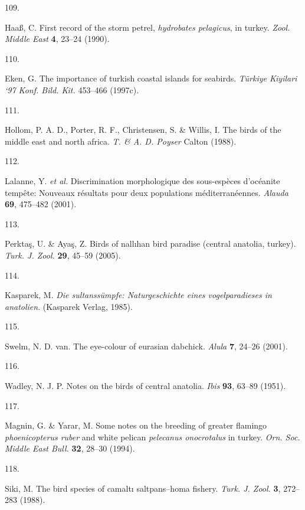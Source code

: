 \documentclass[
  letterpaper,
  DIV=11,
  numbers=noendperiod]{scrreprt}
\newlength{\cslhangindent}
\newlength{\csllabelwidth}
\newenvironment{CSLReferences}[2] %
 {\begin{list}{}{%
  \setlength{\itemindent}{0pt}
  \setlength{\leftmargin}{0pt}
  \setlength{\parsep}{0pt}
  \ifodd #1
   \setlength{\leftmargin}{\cslhangindent}
   \setlength{\itemindent}{-1\cslhangindent}
  \fi
  \setlength{\itemsep}{#2\baselineskip}}}
 {\end{list}}
\newcommand{\CSLLeftMargin}[1]{\parbox[t]{\csllabelwidth}{\strut#1\strut}}
\newcommand{\CSLRightInline}[1]{\parbox[t]{\linewidth - \csllabelwidth}{\strut#1\strut}}
\begin{document}
\begin{CSLReferences}{0}{0}
\CSLLeftMargin{109. }%
\CSLRightInline{Haaß, C. First record of the storm petrel,
\emph{hydrobates pelagicus}, in turkey. \emph{Zool. Middle East}
\textbf{4}, 23--24 (1990).}

\CSLLeftMargin{110. }%
\CSLRightInline{Eken, G. The importance of turkish coastal islands for
seabirds. \emph{Türkiye Kiyilari `97 Konf. Bild. Kit.} 453--466
(1997c).}

\CSLLeftMargin{111. }%
\CSLRightInline{Hollom, P. A. D., Porter, R. F., Christensen, S. \&
Willis, I. The birds of the middle east and north africa. \emph{T. \& A.
D. Poyser} Calton (1988).}

\CSLLeftMargin{112. }%
\CSLRightInline{Lalanne, Y. \emph{et al.} Discrimination morphologique
des sous-espèces d'océanite tempête: Nouveaux résultats pour deux
populations méditerranéennes. \emph{Alauda} \textbf{69}, 475--482
(2001).}

\CSLLeftMargin{113. }%
\CSLRightInline{Perktaş, U. \& Ayaş, Z. Birds of nallıhan bird paradise
(central anatolia, turkey). \emph{Turk. J. Zool.} \textbf{29}, 45--59
(2005).}

\CSLLeftMargin{114. }%
\CSLRightInline{Kasparek, M. \emph{Die sultanssümpfe: Naturgeschichte
eines vogelparadieses in anatolien}. (Kasparek Verlag, 1985).}

\CSLLeftMargin{115. }%
\CSLRightInline{Swelm, N. D. van. The eye-colour of eurasian dabchick.
\emph{Alula} \textbf{7}, 24--26 (2001).}

\CSLLeftMargin{116. }%
\CSLRightInline{Wadley, N. J. P. Notes on the birds of central anatolia.
\emph{Ibis} \textbf{93}, 63--89 (1951).}

\CSLLeftMargin{117. }%
\CSLRightInline{Magnin, G. \& Yarar, M. Some notes on the breeding of
greater flamingo \emph{phoenicopterus ruber} and white pelican
\emph{pelecanus onocrotalus} in turkey. \emph{Orn. Soc. Middle East
Bull.} \textbf{32}, 28--30 (1994).}

\CSLLeftMargin{118. }%
\CSLRightInline{Siki, M. The bird species of camaltı saltpans--homa
fishery. \emph{Turk. J. Zool.} \textbf{3}, 272--283 (1988).}


\end{CSLReferences}
\end{document}
